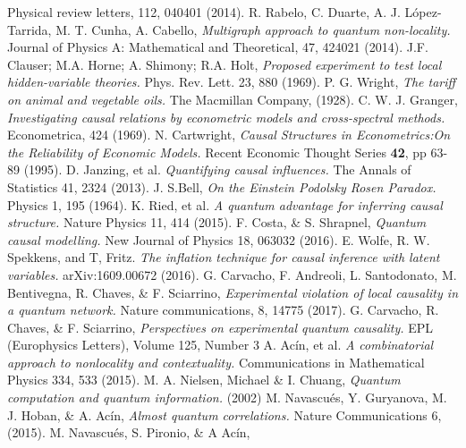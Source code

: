 \documentclass[letterpaper]{article}
\begin{document}
\begin{thebibliography}{}
         Physical review letters, 112, 040401 (2014).
      R. Rabelo, C. Duarte, A. J.  López-Tarrida, M. T. Cunha, A. Cabello,
         {\em Multigraph approach to quantum non-locality.}
         Journal of Physics A: Mathematical and Theoretical, 47, 424021 (2014).
     J.F. Clauser; M.A. Horne; A. Shimony; R.A. Holt, 
        {\em Proposed experiment to test local hidden-variable theories.}
        Phys. Rev. Lett. 23, 880 (1969).
     P. G. Wright, 
        {\em The tariff on animal and vegetable oils.} 
        The Macmillan Company, (1928).
     C. W. J. Granger, 
        {\em Investigating causal relations by econometric models and cross-spectral methods.}
        Econometrica, 424 (1969).
     N. Cartwright, 
        {\em Causal Structures in Econometrics:On the Reliability of Economic Models.}
        Recent Economic Thought Series \textbf{42}, pp 63-89 (1995).
     D. Janzing, et al. 
        {\em Quantifying causal influences.} 
        The Annals of Statistics 41, 2324 (2013).
     J. S.Bell, 
        {\em On the Einstein Podolsky Rosen Paradox.} 
        Physics 1, 195 (1964).
     K. Ried, et al. 
        {\em A quantum advantage for inferring causal structure.}
        Nature Physics 11, 414 (2015).
      F. Costa, \& S. Shrapnel,
        {\em Quantum causal modelling.} 
        New Journal of Physics 18, 063032 (2016).
     E. Wolfe, R. W. Spekkens, and T, Fritz. 
        {\em The inflation technique for causal inference with latent variables.} arXiv:1609.00672 (2016). 
     G. Carvacho, F. Andreoli, L. Santodonato, M. Bentivegna, R. Chaves, \& F. Sciarrino, 
        {\em Experimental violation of local causality in a quantum network.} 
        Nature communications, 8, 14775 (2017).
     G. Carvacho, R. Chaves, \& F. Sciarrino, 
        {\em Perspectives on experimental quantum causality.} 
        EPL (Europhysics Letters), Volume 125, Number 3
     A. Acín, et al.
        {\em A combinatorial approach to nonlocality and contextuality.} 
        Communications in Mathematical Physics 334, 533 (2015).
     M. A. Nielsen, Michael \& I. Chuang, 
        {\em Quantum computation and quantum information.} 
        (2002)
      M. Navascués, Y. Guryanova, M. J. Hoban, \& A. Acín,       {\em Almost quantum correlations.}
        Nature Communications 6, (2015).
      M. Navascués, S. Pironio, \& A Acín, 

\end{thebibliography}
\end{document}
